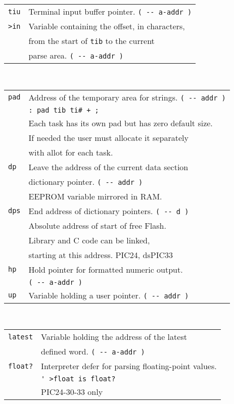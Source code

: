 \documentclass[10pt,landscape,a4paper]{article}
\begin{document}
\begin{multicols}{3}
\begin{tabular}{@{}ll@{}}
\verb!tiu!  & Terminal input buffer pointer. \verb!( -- a-addr )! \\
\verb!>in!  & Variable containing the offset, in characters, \\
            & from the start of \verb!tib! to the current \\
            & parse area. \verb!( -- a-addr )! \\
\end{tabular}\\
\begin{tabular}{@{}ll@{}}
\verb!pad!  & Address of the temporary area for strings. \verb!( -- addr )! \\
            & \verb!: pad tib ti# + ;! \\
            & Each task has its own pad but has zero default size. \\
            & If needed the user must allocate it separately \\
            & with allot for each task. \\
\verb!dp!   & Leave the address of the current data section \\
            & dictionary pointer. \verb!( -- addr )! \\
            & EEPROM variable mirrored in RAM. \\
\verb!dps!  & End address of dictionary pointers. \verb!( -- d )! \\
            & Absolute address of start of free Flash. \\
            & Library and C code can be linked, \\
            & starting at this address.  PIC24, dsPIC33 \\
\verb!hp!   & Hold pointer for formatted numeric output.\\
            & \verb!( -- a-addr )! \\
\verb!up!   & Variable holding a user pointer. \verb!( -- addr )!\\
\end{tabular}\\
\begin{tabular}{@{}ll@{}}
\verb!latest! & Variable holding the address of the latest \\
              & defined word. \verb!( -- a-addr )! \\
\verb!float?! & Interpreter defer for parsing floating-point values.\\
              & \verb!' >float is float?! \\
              & PIC24-30-33 only \\
\end{tabular}


\end{multicols}
\end{document}
